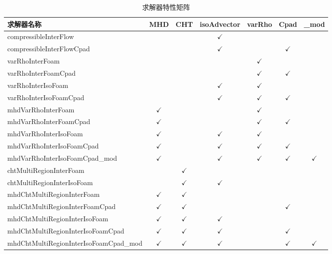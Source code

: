 \documentclass[11pt,a4paper]{article}
\begin{document}
\begin{table}[H]
\centering
\caption{求解器特性矩阵}
\label{tab:solver-matrix}
\scriptsize
\begin{tabular}{@{}lcccccc@{}}
\toprule
\textbf{求解器名称} & \textbf{MHD} & \textbf{CHT} & \textbf{isoAdvector} & \textbf{varRho} & \textbf{Cpad} & \textbf{\_mod} \\
\midrule
compressibleInterFlow        &     &     & $\checkmark$ &   &   &   \\
compressibleInterFlowCpad    &     &     & $\checkmark$ &   & $\checkmark$ &   \\
varRhoInterFoam              &     &     &   & $\checkmark$ &   &   \\
varRhoInterFoamCpad          &     &     &   & $\checkmark$ & $\checkmark$ &   \\
varRhoInterIsoFoam           &     &     & $\checkmark$ & $\checkmark$ &   &   \\
varRhoInterIsoFoamCpad       &     &     & $\checkmark$ & $\checkmark$ & $\checkmark$ &   \\
mhdVarRhoInterFoam           & $\checkmark$ & &   & $\checkmark$ &   &   \\
mhdVarRhoInterFoamCpad       & $\checkmark$ & &   & $\checkmark$ & $\checkmark$ &   \\
mhdVarRhoInterIsoFoam        & $\checkmark$ & & $\checkmark$ & $\checkmark$ &   &   \\
mhdVarRhoInterIsoFoamCpad    & $\checkmark$ & & $\checkmark$ & $\checkmark$ & $\checkmark$ &   \\
mhdVarRhoInterIsoFoamCpad\_mod & $\checkmark$ & & $\checkmark$ & $\checkmark$ & $\checkmark$ & $\checkmark$ \\
chtMultiRegionInterFoam      &     & $\checkmark$ &   &   &   &   \\
chtMultiRegionInterIsoFoam   &     & $\checkmark$ & $\checkmark$ &   &   &   \\
mhdChtMultiRegionInterFoam   & $\checkmark$ & $\checkmark$ &   &   &   &   \\
mhdChtMultiRegionInterFoamCpad & $\checkmark$ & $\checkmark$ &   &   & $\checkmark$ &   \\
mhdChtMultiRegionInterIsoFoam & $\checkmark$ & $\checkmark$ & $\checkmark$ &   &   &   \\
mhdChtMultiRegionInterIsoFoamCpad & $\checkmark$ & $\checkmark$ & $\checkmark$ &   & $\checkmark$ &   \\
mhdChtMultiRegionInterIsoFoamCpad\_mod & $\checkmark$ & $\checkmark$ & $\checkmark$ &   & $\checkmark$ & $\checkmark$ \\
\bottomrule
\end{tabular}
\end{table}
\end{document}
